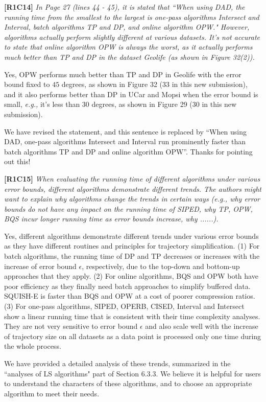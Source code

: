 \documentclass{letter}
\newcommand{\eg}{\emph{e.g.,}\xspace}
\begin{document}
\textbf{[R1C14]} \emph{ In Page 27 (lines 44 - 45), it is stated that ``When using DAD, the running time from the smallest to the largest is one-pass algorithms Intersect and Interval, batch algorithms TP and DP, and online algorithm OPW." However, algorithms actually perform slightly different at various datasets. It's not accurate to state that online algorithm OPW is always the worst, as it actually performs much better than TP and DP in the dataset Geolife (as shown in Figure 32(2)).}

Yes, OPW performs much better than TP and DP in Geolife with the error bound fixed to $45$ degrees, as shown in Figure 32 (33 in this new submission), and it also performs better than DP in UCar and Mopsi when the error bound is small, \eg it's less than 30 degrees, as shown in Figure 29 (30 in this new submission).

We have revised the statement, and this sentence is replaced by ``When using DAD, one-pass algorithms Intersect and Interval run prominently faster than batch algorithms TP and DP and online algorithm OPW''.
Thanks for pointing out this!

\textbf{[R1C15]} \emph{ When evaluating the running time of different algorithms under various error bounds, different algorithms demonstrate different trends. The authors might want to explain why algorithms change the trends in certain ways (e.g., why error bounds do not have any impact on the running time of SIPED, why TP, OPW, BQS incur longer running time as error bounds increase, why ......).}

Yes, different algorithms demonstrate different trends under various error bounds as they have different routines and principles for trajectory simplification. (1)  For batch algorithms, the running time of DP and TP decreases or increases with the increase of error bound $\epsilon$, respectively, due to the top-down and bottom-up approaches that they apply.
%
(2) For online algorithms, BQS and OPW both have poor efficiency as they finally need batch approaches to simplify buffered data. SQUISH-E is faster than BQS and OPW at a cost of poorer compression ratios.
%
(3) For one-pass algorithms, SIPED, OPERB, CISED, Interval and Intersect show a linear running time that is consistent with their time complexity analyses. They are not very sensitive to error bound $\epsilon$ and also scale well with the increase of trajectory size on all datasets as a data point is processed only one time during the whole process.

We have provided a detailed analysis of these trends, summarized in the ``analyses of LS algorithms" part of Section 6.3.3.
%
We believe it is helpful for users to understand the characters of these algorithms, and to choose an appropriate algorithm to meet their needs.
\end{document}
